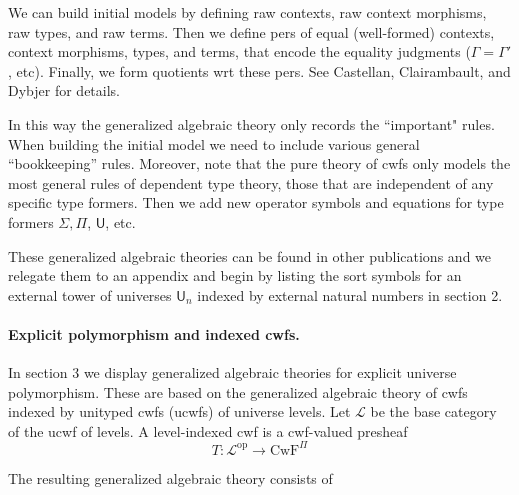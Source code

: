 \documentclass[11pt,a4paper]{article}
\theoremstyle{definition}
\newcommand{\UU}{\mathsf{U}}
\newcommand{\op}{\mathrm{op}}
\def\UU{\mathsf{U}}
\def\L{{\mathcal{L}}}
\def\CwF{\mathrm{CwF}}
\begin{document}
We can build initial models by defining raw contexts, raw context morphisms, raw types, and raw terms. Then we 
define pers of equal (well-formed) contexts,  context morphisms, types, and terms, that encode the equality judgments ($\Gamma = \Gamma'$, etc). Finally, we form quotients wrt these pers. See Castellan, Clairambault, and Dybjer \cite{castellan:warsaw,CCD:lambek} for details.

In this way the generalized algebraic theory only records the ``important" rules. When building the initial model we need to include various general ``bookkeeping'' rules. Moreover, note that the pure theory of cwfs only models the most general rules of dependent type theory, those that are independent of any specific type formers. Then we add new operator symbols and equations for type formers $\Sigma, \Pi$, $\UU$, etc.

These generalized algebraic theories can be found in other publications \cite{dybjer:torino, bezem:hofmann} and we relegate them to an appendix and begin by listing the sort symbols for an external tower of universes $\UU_n$ indexed by external natural numbers in section 2.

\paragraph{Explicit polymorphism and indexed cwfs.} In section 3 we display generalized algebraic theories for explicit universe polymorphism. These are based on the generalized algebraic theory of cwfs indexed by unityped cwfs (ucwfs) of universe levels. Let $\L$ be the base category of the ucwf of levels. A level-indexed cwf is a cwf-valued presheaf 
$$
T : \L^\op \to \CwF^\Pi
$$

The resulting generalized algebraic theory consists of
\end{document}
